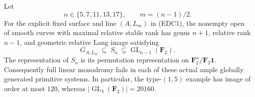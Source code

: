 \begin{theorem}
\label{thm:root-primitive-prime-permutation-counterexamples}
Let
\[
                     n\in\{5,7,11,13,17\},\qquad
                       m=(n-1)/2.
                                                        \tag{EDC10}
\]
For the explicit fixed surface and line \((A,L_m)\) in (EDC1),
the nonempty open of smooth curves with maximal relative stable
rank has genus \(n+1\), relative rank \(n-1\), and geometric
relative Lang image satisfying
\[
          G_{A,L_m}\ \subseteq\ S_n\
                     \subsetneq\operatorname{GL}_{n-1}(\mathbf F_2).
                                                        \tag{EDC11}
\]
The representation of \(S_n\) is its permutation representation
on \(\mathbf F_2^n/\mathbf F_2\mathbf1\). Consequently full
linear monodromy fails in each of these actual ample globally
generated primitive systems. In particular, the type-\((1,5)\)
example has image of order at most \(120\), whereas
\(\lvert\operatorname{GL}_4(\mathbf F_2)\rvert=20160\).
\end{theorem}
